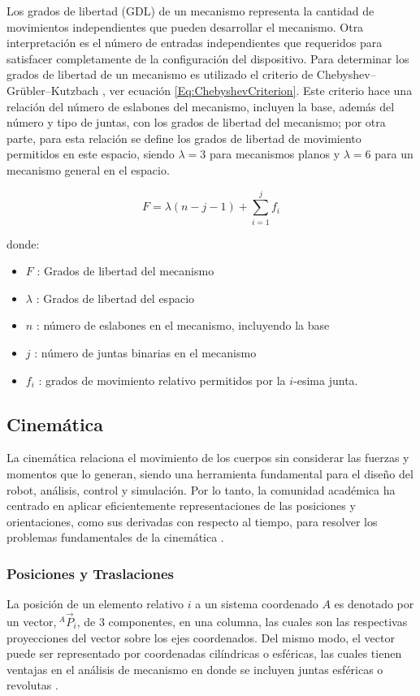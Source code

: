 Los grados de libertad (GDL) de un mecanismo representa la cantidad de movimientos independientes que pueden desarrollar el mecanismo. Otra interpretación es el número de entradas independientes que requeridos para satisfacer completamente de la configuración del dispositivo. Para determinar los grados de libertad de un mecanismo es utilizado el criterio de Chebyshev–Grübler–Kutzbach \citep{taghirad2013parallel}, ver ecuación \ref{Eq:ChebyshevCriterion}. Este criterio hace una relación del número de eslabones del mecanismo, incluyen la base, además del número y tipo de juntas, con los grados de libertad del mecanismo; por otra parte, para esta relación se define los grados de libertad de movimiento permitidos en este espacio, siendo $\lambda = 3$ para mecanismos planos y $\lambda = 6$ para un mecanismo general en el espacio.

\begin{equation}
    F = \lambda \left( n - j - 1 \right) + \sum_{i=1}^j f_i
    \label{Eq:ChebyshevCriterion}
\end{equation}

donde:
\begin{itemize}
    \item $F$ : Grados de libertad del mecanismo
    \item $\lambda$ : Grados de libertad del espacio
    \item $n$ : número de eslabones en el mecanismo, incluyendo la base
    \item $j$ : número de juntas binarias en el mecanismo
    \item $f_i$ : grados de movimiento relativo permitidos por la $i$-esima junta.
\end{itemize}

\subsection*{Cinemática}
La cinemática relaciona el movimiento de los cuerpos sin considerar las fuerzas y momentos que lo generan, siendo una herramienta fundamental para el diseño del robot, análisis, control y simulación. Por lo tanto, la comunidad académica ha centrado en aplicar eficientemente representaciones de las posiciones y orientaciones, como sus derivadas con respecto al tiempo, para resolver los problemas fundamentales de la cinemática \citep{waldron2016kinematics}.

\subsubsection*{Posiciones y Traslaciones} 
La posición de un elemento relativo $i$ a un sistema coordenado $A$ es denotado por un vector,$~^{A}\vec{P}_i$, de 3 componentes, en una columna, las cuales son las respectivas proyecciones del vector sobre los ejes coordenados. Del mismo modo, el vector puede ser representado por coordenadas cilíndricas o esféricas, las cuales tienen ventajas en el análisis de mecanismo en donde se incluyen juntas esféricas o revolutas \citep{waldron2016kinematics}.

